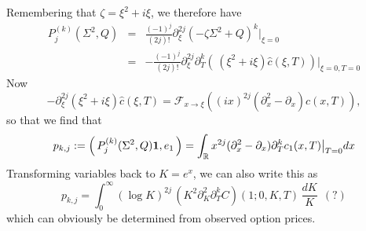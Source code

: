 \documentclass[a4paper, 11pt]{amsart}
\newtheorem{definition and theorem}[theorem]{Definition and   
Theorem}
\begin{document}
Remembering that $\zeta = \xi ^2 + i \xi $, we therefore have
\begin{eqnarray*}
    P^{(k) } _j (\Sigma ^2 , Q ) &=& \frac{(-1 )^j }{(2j )! } \partial _{\xi } ^{2j } ( - \zeta \Sigma ^2 + Q )^k |_{\xi = 0 } \\
    &=& - \frac{(-1 )^j }{(2j )! } \partial _{\xi } ^{2j } \partial _T ^k \left( \, (\xi ^2 + i \xi ) \widehat{c } (\xi , T ) \right) |_{\xi = 0 , T = 0 }
\end{eqnarray*}
Now
$$
    - \partial _{\xi } ^{2j } (\xi ^2 + i \xi ) \widehat{c } (\xi , T ) = \mathcal{F }_{x \to \xi } \left( (ix )^{2j } (\partial _x ^2 - \partial _x ) c(x, T ) \right) ,
$$
so that we find that
\begin{equation} \label{eq:donn�es_IP_bis}
    p_{k, j } := \left( \, P^{(k) } _j (\Sigma ^2 , Q ) \mathbf{1 } , e_1 \, \right)  = \int _{\mathbb{R } } x^{2j } (\partial _x ^2 - \partial _x ) \partial _T ^k c_1 (x, T ) \big{\vert }_{T = 0 } dx
\end{equation}
Transforming variables back to $K = e^x $, we can also write this as
\begin{equation}
    p_{k, j } = \int _0 ^{\infty } (\log K )^{2j } \, \left( K^2 \partial _K ^2 \partial _T ^k C \right) (1 ; 0 , K, T ) \, \frac{dK }{K } \ \ (?)
\end{equation}
which can obviously be determined from observed option prices.
\end{document}
